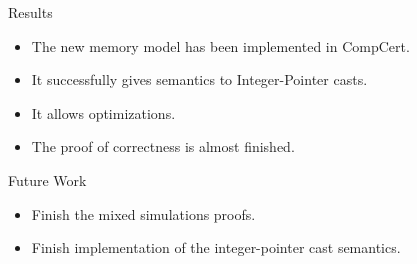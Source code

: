 \begin{frame}{\secname}

  \begin{exampleblock}{Results}
    \begin{itemize}
    \item The new memory model has been implemented in CompCert.
    \item It successfully gives semantics to Integer-Pointer casts.
    \item It allows optimizations.
    \item The proof of correctness is almost finished.
    \end{itemize}
  \end{exampleblock}
  \vfill
  \begin{block}{Future Work}
    \begin{itemize}
    \item Finish the mixed simulations proofs.
    \item Finish implementation of the integer-pointer cast semantics.
    \end{itemize}
  \end{block}
  
\end{frame}


